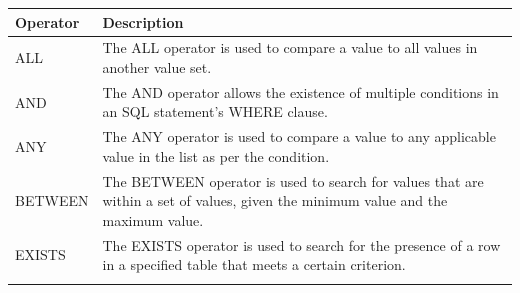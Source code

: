\documentclass[]{book}
\theoremstyle{definition}
\theoremstyle{definition}
\theoremstyle{definition}
\theoremstyle{remark}
\begin{document}
\begin{longtable}[]{@{}ll@{}}
\toprule
\begin{minipage}[b]{0.08\columnwidth}\raggedright
Operator\strut
\end{minipage} & \begin{minipage}[b]{0.86\columnwidth}\raggedright
Description\strut
\end{minipage}\tabularnewline
\midrule
\endhead
\begin{minipage}[t]{0.08\columnwidth}\raggedright
ALL\strut
\end{minipage} & \begin{minipage}[t]{0.86\columnwidth}\raggedright
The ALL operator is used to compare a value to all values in another
value set.\strut
\end{minipage}\tabularnewline
\begin{minipage}[t]{0.08\columnwidth}\raggedright
AND\strut
\end{minipage} & \begin{minipage}[t]{0.86\columnwidth}\raggedright
The AND operator allows the existence of multiple conditions in an SQL
statement's WHERE clause.\strut
\end{minipage}\tabularnewline
\begin{minipage}[t]{0.08\columnwidth}\raggedright
ANY\strut
\end{minipage} & \begin{minipage}[t]{0.86\columnwidth}\raggedright
The ANY operator is used to compare a value to any applicable value in
the list as per the condition.\strut
\end{minipage}\tabularnewline
\begin{minipage}[t]{0.08\columnwidth}\raggedright
BETWEEN\strut
\end{minipage} & \begin{minipage}[t]{0.86\columnwidth}\raggedright
The BETWEEN operator is used to search for values that are within a set
of values, given the minimum value and the maximum value.\strut
\end{minipage}\tabularnewline
\begin{minipage}[t]{0.08\columnwidth}\raggedright
EXISTS\strut
\end{minipage} & \begin{minipage}[t]{0.86\columnwidth}\raggedright
The EXISTS operator is used to search for the presence of a row in a
specified table that meets a certain criterion.\strut
\end{minipage}\tabularnewline
\begin{minipage}[t]{0.08\columnwidth}\raggedright

\end{minipage}
\end{longtable}
\end{document}
